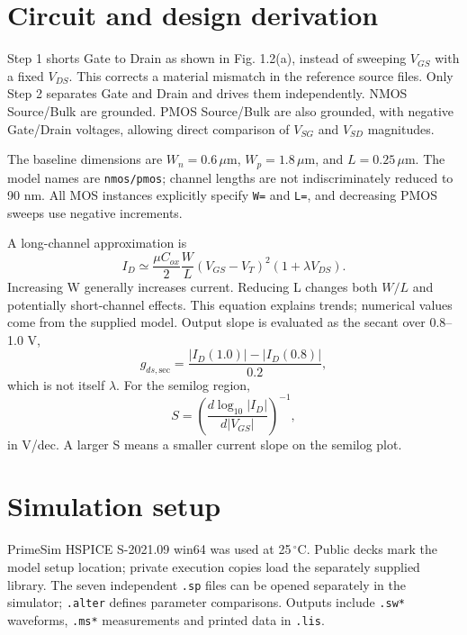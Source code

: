 \section{Circuit and design derivation}
Step 1 shorts Gate to Drain as shown in Fig. 1.2(a), instead of sweeping $V_{GS}$ with a fixed $V_{DS}$. This corrects a material mismatch in the reference source files. Only Step 2 separates Gate and Drain and drives them independently. NMOS Source/Bulk are grounded. PMOS Source/Bulk are also grounded, with negative Gate/Drain voltages, allowing direct comparison of $V_{SG}$ and $V_{SD}$ magnitudes.

The baseline dimensions are $W_n=0.6\,\mu\mathrm m$, $W_p=1.8\,\mu\mathrm m$, and $L=0.25\,\mu\mathrm m$. The model names are \texttt{nmos/pmos}; channel lengths are not indiscriminately reduced to 90 nm. All MOS instances explicitly specify \texttt{W=} and \texttt{L=}, and decreasing PMOS sweeps use negative increments.

A long-channel approximation is
\[
 I_D\simeq\frac{\mu C_{ox}}{2}\frac WL(V_{GS}-V_T)^2(1+\lambda V_{DS}).
\]
Increasing W generally increases current. Reducing L changes both $W/L$ and potentially short-channel effects. This equation explains trends; numerical values come from the supplied model. Output slope is evaluated as the secant over 0.8--1.0 V,
\[
g_{ds,\mathrm{sec}}=\frac{|I_D(1.0)|-|I_D(0.8)|}{0.2},
\]
which is not itself $\lambda$. For the semilog region,
\[
S=\left(\frac{d\log_{10}|I_D|}{d|V_{GS}|}\right)^{-1},
\]
in V/dec. A larger S means a smaller current slope on the semilog plot.

\section{Simulation setup}
PrimeSim HSPICE S-2021.09 win64 was used at 25\,$^\circ$C. Public decks mark the model setup location; private execution copies load the separately supplied library. The seven independent \texttt{.sp} files can be opened separately in the simulator; \texttt{.alter} defines parameter comparisons. Outputs include \texttt{.sw*} waveforms, \texttt{.ms*} measurements and printed data in \texttt{.lis}.

